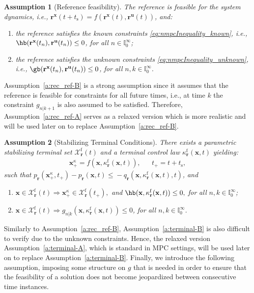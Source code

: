 \documentclass[journal]{IEEEtran}
\newcommand{\x}{{\mathbf{x}}}
\renewcommand{\u}{{\mathbf{u}}}
\renewcommand{\r}{{\mathbf{r}}}
\newtheorem{Assumption}{Assumption}
\begin{document}
	\begin{Assumption}[Reference feasibility] \label{a:rec_ref}
			The reference is feasible for the system  dynamics, i.e., $\r^\x(t+t_\mathrm{s})=f(\r^\x(t),\r^\u(t))$, and: 
			\begin{enumerate}[label={\textbf{\alph*)}}, ref={\ref{a:rec_ref}\alph*}]
				\item \label{a:rec_ref-A}
				the reference satisfies the known constraints \eqref{eq:nmpcInequality_known}, i.e., $\hb(\r^\x(t_n),\r^\u(t_n)) \leq{} 0$, for all $n\in\mathbb{I}_0^\infty$;
				\item \label{a:rec_ref-B}
				the reference satisfies the unknown constraints \eqref{eq:nmpcInequality_unknown}, i.e., $\gb(\r^\x(t_n),\r^\u(t_n))\leq 0$, 
				for all $n,k\in\mathbb{I}_0^\infty$.
		\end{enumerate}
	\end{Assumption}
	Assumption~\ref{a:rec_ref-B} is a strong assumption since it assumes that the reference is feasible for constraints for all future times, i.e., at time $k$ the constraint $g_{n|k+1}$ is also assumed to be satisfied. Therefore, Assumption~\ref{a:rec_ref-A} serves as a relaxed version which is more realistic and will be used later on to replace Assumption~\ref{a:rec_ref-B}.
	\begin{Assumption}[Stabilizing Terminal Conditions] \label{a:terminal}
		There exists a parametric stabilizing terminal set  $\mathcal{X}^\mathrm{f}_\r(t)$ and a terminal control law $\kappa^\mathrm{f}_\r(\mathbf{x},t)$ yielding:
		\begin{align*}
		\mathbf{x}_+^\kappa=f(\mathbf{x},\kappa^\mathrm{f}_\r(\mathbf{x},t)), && t_+ = t + t_\mathrm{s},
		\end{align*}
		such that $p_\r(\mathbf{x}_+^\kappa,t_+) - p_\r(\mathbf{x},t) \leq{} - q_\r(\mathbf{x},\kappa^\mathrm{f}_\r(\mathbf{x},t),t)$, and
		\begin{enumerate}[label={\textbf{\alph*)}}, ref={\ref{a:terminal}\alph*}]
		\item \label{a:terminal-A}$\mathbf{x}\in\mathcal{X}^\mathrm{f}_\r(t)\Rightarrow \mathbf{x}^\kappa_+\in\mathcal{X}^\mathrm{f}_\r(t_+),$ and $\hb(\mathbf{x},\kappa^\mathrm{f}_\r(\mathbf{x},t)) \leq{} 0,$ for all $n,k\in\mathbb{I}_0^\infty$;
		\item \label{a:terminal-B}
		$\x\in\mathcal{X}_\r^\mathrm{f}(t)\Rightarrow g_{n|k}(\x,\kappa_\r^\mathrm{f}(\x,t))\leq{}0$, for all $n,k\in\mathbb{I}_0^\infty$.
	\end{enumerate}
	\end{Assumption}
	Similarly to Assumption~\ref{a:rec_ref-B}, Assumption~\ref{a:terminal-B} is also difficult to verify due to the unknown constraints. Hence, the relaxed version Assumption~\ref{a:terminal-A}, which is standard in MPC settings, will be used later on to replace Assumption~\ref{a:terminal-B}. Finally, we introduce the following assumption, imposing some structure on $g$ that is needed in order to ensure that the feasibility of a solution does not become jeopardized between consecutive time instances.
	
\end{document}

